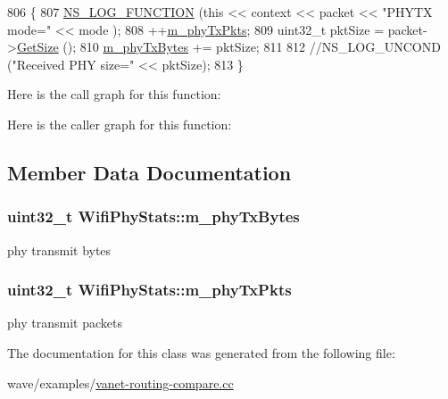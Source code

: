 \begin{DoxyCode}
806 \{
807   \hyperlink{log-macros-disabled_8h_a90b90d5bad1f39cb1b64923ea94c0761}{NS\_LOG\_FUNCTION} (\textcolor{keyword}{this} << context << packet << \textcolor{stringliteral}{"PHYTX mode="} << mode );
808   ++\hyperlink{classWifiPhyStats_ac44edc1ac4d40a158f4bd44d19f8ea06}{m\_phyTxPkts};
809   uint32\_t pktSize = packet->\hyperlink{classns3_1_1Packet_a462855c9929954d4301a4edfe55f4f1c}{GetSize} ();
810   \hyperlink{classWifiPhyStats_a124dc861c6c9336ea9b6924875365735}{m\_phyTxBytes} += pktSize;
811 
812   \textcolor{comment}{//NS\_LOG\_UNCOND ("Received PHY size=" << pktSize);}
813 \}
\end{DoxyCode}


Here is the call graph for this function\+:




Here is the caller graph for this function\+:




\subsection{Member Data Documentation}
\subsubsection[{\texorpdfstring{m\+\_\+phy\+Tx\+Bytes}{m_phyTxBytes}}]{\setlength{\rightskip}{0pt plus 5cm}uint32\+\_\+t Wifi\+Phy\+Stats\+::m\+\_\+phy\+Tx\+Bytes\hspace{0.3cm}{\ttfamily [private]}}\hypertarget{classWifiPhyStats_a124dc861c6c9336ea9b6924875365735}{}\label{classWifiPhyStats_a124dc861c6c9336ea9b6924875365735}


phy transmit bytes 

\subsubsection[{\texorpdfstring{m\+\_\+phy\+Tx\+Pkts}{m_phyTxPkts}}]{\setlength{\rightskip}{0pt plus 5cm}uint32\+\_\+t Wifi\+Phy\+Stats\+::m\+\_\+phy\+Tx\+Pkts\hspace{0.3cm}{\ttfamily [private]}}\hypertarget{classWifiPhyStats_ac44edc1ac4d40a158f4bd44d19f8ea06}{}\label{classWifiPhyStats_ac44edc1ac4d40a158f4bd44d19f8ea06}


phy transmit packets 



The documentation for this class was generated from the following file\+:\begin{DoxyCompactItemize}
\item 
wave/examples/\hyperlink{vanet-routing-compare_8cc}{vanet-\/routing-\/compare.\+cc}\end{DoxyCompactItemize}
